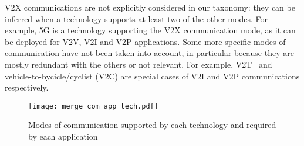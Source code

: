 \acrshort{V2X} communications are not explicitly considered in our taxonomy: they can be inferred when a technology supports at least two of the other modes. 
For example, 5G is a technology supporting the V2X communication mode, as it can be deployed for V2V, V2I and V2P applications. 
Some more specific modes of communication have not been taken into account, in particular because they are mostly redundant with the others or not relevant. For example, \acrfull{V2T}~\cite{vandung_nguyen_efficient_2016} and vehicle-to-bycicle/cyclist (V2C) are special cases of \acrshort{V2I} and \acrshort{V2P} communications respectively. 


\begin{figure}[ht!]
  \begin{center}
    \texttt{[image: merge\_com\_app\_tech.pdf]}
    \caption{Modes of communication supported by each technology and required by each application}
    \label{fig:fusion_comm}
  \end{center}
\end{figure}

